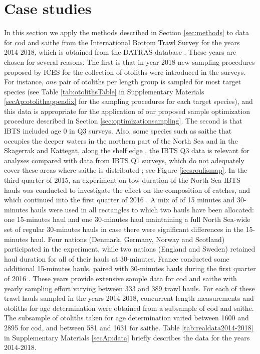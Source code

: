 \documentclass[a4paper 12pt]{article}
\numberwithin{equation}{section}
\begin{document}
\section{Case studies}
\label{sec:data}
In this section we apply the methods described in Section \ref{sec:methods} to data for cod and saithe from the International Bottom Trawl Survey for the years 2014-2018, which is obtained from the DATRAS database \citep{datras}. These years are chosen for several reasons. The first is that in year 2018 new sampling procedures proposed by ICES for the collection of otoliths were introduced in the surveys. For instance, $one$ pair of otoliths per length group is sampled for most target species (see Table \ref{tab:otolithsTable} in Supplementary Materials \ref{secAp:otolithappendix} for the sampling procedures for each target species), and this data is appropriate for the application of our proposed sample optimization procedure described in Section \ref{sec:optimizationsampling}. The second is that IBTS included age 0 in Q3 surveys. Also, some species such as saithe that occupies the deeper waters in the northern part of the North Sea and in the Skagerrak and Kattegat, along the shelf edge \citep{ICESFishMaps}, the IBTS Q3 data is relevant for analyses compared with data from IBTS Q1 surveys, which do not adequately cover these areas where saithe is distributed \citep{ICESJune2016}; see Figure \ref{icesroufismap}. In the third quarter of 2015, an experiment on tow duration of the North Sea IBTS hauls was conducted to investigate the effect on the composition of catches, and which continued into the first quarter of 2016 \citep{ICES2016c}. A mix of of 15 minutes and 30-minutes hauls were used in all rectangles to which two hauls have been allocated: one 15-minutes haul and one 30-minutes haul maintaining a full  North Sea-wide set of regular 30-minutes hauls in case there were significant differences in the 15-minutes haul. Four nations (Denmark, Germany, Norway and Scotland) participated in the experiment, while two nations (England and Sweden) retained haul duration for all of their hauls at 30-minutes. France conducted some additional 15-minutes hauls, paired with 30-minutes hauls during the first quarter of 2016 \citep{ICES2016c}. These years provide extensive sample data for cod and saithe with yearly sampling effort varying between 333 and 389 trawl hauls. For each of these trawl hauls sampled in the years 2014-2018, concurrent length measurements and otoliths for age determination were obtained from a subsample of cod and saithe. The subsample of otoliths taken for age determination varied between 1600 and 2895 for cod, and between 581 and 1631 for saithe. Table \ref{tab:realdata2014-2018} in Supplementary Materials \ref{secAp:data} briefly describes the data for the years 2014-2018. 
\end{document}

